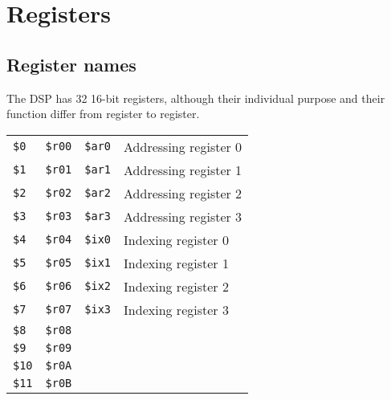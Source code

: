 \documentclass[oneside,english,a4paper,10pt,oneside,openany,final]{memoir}
\newcommand{\Register}[1]{\texttt{#1}}
\begin{document}
\pagebreak{}

\chapter{Registers}

\section{Register names}

The DSP has 32 16-bit registers, although their individual purpose and their function differ from register to register.

\begin{table}[htb]
\centering
\begin{tabular}{|l|l|l|l|}
\hline
                &                  &                      &                             \\ \hline
\Register{\$0}  & \Register{\$r00} & \Register{\$ar0}     & Addressing register 0       \\ \hline
\Register{\$1}  & \Register{\$r01} & \Register{\$ar1}     & Addressing register 1       \\ \hline
\Register{\$2}  & \Register{\$r02} & \Register{\$ar2}     & Addressing register 2       \\ \hline
\Register{\$3}  & \Register{\$r03} & \Register{\$ar3}     & Addressing register 3       \\ \hline
\Register{\$4}  & \Register{\$r04} & \Register{\$ix0}     & Indexing register 0         \\ \hline
\Register{\$5}  & \Register{\$r05} & \Register{\$ix1}     & Indexing register 1         \\ \hline
\Register{\$6}  & \Register{\$r06} & \Register{\$ix2}     & Indexing register 2         \\ \hline
\Register{\$7}  & \Register{\$r07} & \Register{\$ix3}     & Indexing register 3         \\ \hline
\Register{\$8}  & \Register{\$r08} &                      &                             \\ \hline
\Register{\$9}  & \Register{\$r09} &                      &                             \\ \hline
\Register{\$10} & \Register{\$r0A} &                      &                             \\ \hline
\Register{\$11} & \Register{\$r0B} &                      &                             \\ \hline

\end{tabular}
\end{table}
\end{document}
